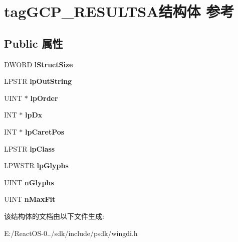 \hypertarget{structtag_g_c_p___r_e_s_u_l_t_s_a}{}\section{tag\+G\+C\+P\+\_\+\+R\+E\+S\+U\+L\+T\+S\+A结构体 参考}
\label{structtag_g_c_p___r_e_s_u_l_t_s_a}
\subsection*{Public 属性}
\begin{DoxyCompactItemize}
\item 
\mbox{\label{structtag_g_c_p___r_e_s_u_l_t_s_a_a6059886fd7a5bd062d37c8e740c290a5}} 
D\+W\+O\+RD {\bfseries l\+Struct\+Size}
\item 
\mbox{\label{structtag_g_c_p___r_e_s_u_l_t_s_a_a3d1e1b6f49249ed3b9bb42153e435fd7}} 
L\+P\+S\+TR {\bfseries lp\+Out\+String}
\item 
\mbox{\label{structtag_g_c_p___r_e_s_u_l_t_s_a_ab6228f9e3b8b6a4cada8f66667ea1086}} 
U\+I\+NT $\ast$ {\bfseries lp\+Order}
\item 
\mbox{\label{structtag_g_c_p___r_e_s_u_l_t_s_a_ad7c2abf915405e845a896799079ebcf7}} 
I\+NT $\ast$ {\bfseries lp\+Dx}
\item 
\mbox{\label{structtag_g_c_p___r_e_s_u_l_t_s_a_abc04cda5f9a37fadd14800fd28fde698}} 
I\+NT $\ast$ {\bfseries lp\+Caret\+Pos}
\item 
\mbox{\label{structtag_g_c_p___r_e_s_u_l_t_s_a_a3997e06358ca776975b223a741540781}} 
L\+P\+S\+TR {\bfseries lp\+Class}
\item 
\mbox{\label{structtag_g_c_p___r_e_s_u_l_t_s_a_a235701747bfb2a45c07bad0da76b22a8}} 
L\+P\+W\+S\+TR {\bfseries lp\+Glyphs}
\item 
\mbox{\label{structtag_g_c_p___r_e_s_u_l_t_s_a_a124c6cdf963b42edff3b3b412460d6f4}} 
U\+I\+NT {\bfseries n\+Glyphs}
\item 
\mbox{\label{structtag_g_c_p___r_e_s_u_l_t_s_a_ab59982d1f35dd8db663625a2b8b1d0dd}} 
U\+I\+NT {\bfseries n\+Max\+Fit}
\end{DoxyCompactItemize}


该结构体的文档由以下文件生成\+:\begin{DoxyCompactItemize}
\item 
E\+:/\+React\+O\+S-\/0../sdk/include/psdk/wingdi.\+h\end{DoxyCompactItemize}
